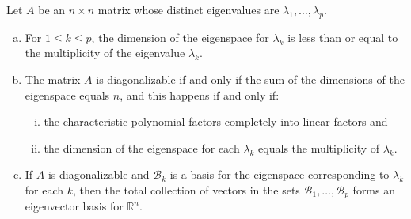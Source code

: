 \documentclass[11pt]{scrartcl}
\theoremstyle{dotlessP}
\theoremstyle{dotlessN}
\newcommand{\reals}{\mathbb{R}} %
\newcommand{\basis}{\mathcal{B}}
\begin{document}
\begin{theorem}
	Let $A$ be an $n \times n$ matrix whose distinct eigenvalues are $\lambda_1, \dots, \lambda_p$.
	\begin{enumerate}[a.]
		\item For $1 \leq k \leq p$, the dimension of the eigenspace for $\lambda_k$ is less than or equal to the multiplicity of the eigenvalue $\lambda_k$.
		\item The matrix $A$ is diagonalizable if and only if the sum of the dimensions of the eigenspace equals $n$, and this happens if and only if:
			\begin{enumerate}[i.]
				\item the characteristic polynomial factors completely into linear factors and
				\item the dimension of the eigenspace for each $\lambda_k$ equals the multiplicity of $\lambda_k$.
			\end{enumerate}
		\item If $A$ is diagonalizable and $\basis_k$ is a basis for the eigenspace corresponding to $\lambda_k$ for each $k$, then the total collection of vectors in the sets $\basis_1, \dots, \basis_p$ forms an eigenvector basis for $\reals^n$.
	\end{enumerate}
\end{theorem}
\end{document}
